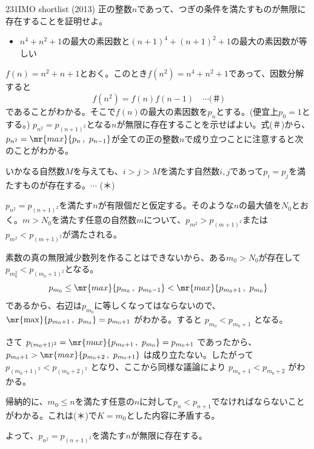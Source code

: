 \begin{prob}{231}{}{IMO shortlist (2013)}
 正の整数$n$であって、つぎの条件を満たすものが無限に存在することを証明せよ。
 \begin{itemize}
  \item[条件:] $n^4+n^2+1$の最大の素因数と$(n+1)^4+(n+1)^2+1$の最大の素因数が等しい 
 \end{itemize}
\end{prob}
$f(n)=n^2+n+1$とおく。このとき$f(n^2)=n^4+n^2+1$であって、因数分解すると
\[ f(n^2)=f(n)f(n-1) \quad\cdots\text{(＃)} \]
であることがわかる。そこで$f(n)$の最大の素因数を$p_n$とする。(便宜上$p_0=1$とする。) $p_{n^2}=p_{(n+1)^2}$となる$n$が無限に存在することを示せばよい。式(＃)から、$p_{n^2}=\mr{max}\{p_n\,,\,\,p_{n-1}\}$が全ての正の整数$n$で成り立つことに注意すると次のことがわかる。

いかなる自然数$M$を与えても、$i>j>M$を満たす自然数$i, j$であって$p_i=p_j$を満たすものが存在する。$\cdots$ (＊)

$p_{n^2}=p_{(n+1)^2}$を満たす$n$が有限個だと仮定する。そのような$n$の最大値を$N_0$とおく。$m>N_0$を満たす任意の自然数$m$について、$p_{m^2}>p_{(m+1)^2}$または$p_{m^2}<p_{(m+1)^2}$が満たされる。

素数の真の無限減少数列を作ることはできないから、ある$m_0>N_0$が存在して$p_{m_0^2}<p_{(m_0+1)^2}$となる。
\[ p_{m_0}\le \mr{max}\{p_{m_0}\,,\,\,p_{m_0-1}\} < \mr{max}\{p_{m_0+1}\,,\,\,p_{m_0}\} \]
であるから、右辺は$p_{m_0}$に等しくなってはならないので、 $\mr{\max}\{p_{m_0+1}\,,\,\,p_{m_0}\}=p_{m_0+1}$ がわかる。すると $p_{m_0}<p_{m_0+1}$ となる。

さて $p_{(m_0+1)^2}=\mr{max}\{p_{m_0+1}\,,\,\,p_{m_0}\}=p_{m_0+1}$ であったから、 $p_{m_0+1}>\mr{max}\{p_{m_0+2}\,,\,\,p_{m_0+1}\}$ は成り立たない。したがって $p_{(m_0+1)^2}<p_{(m_0+2)^2}$ となり、ここから同様な議論により $p_{m_0+1}<p_{m_0+2}$ がわかる。

帰納的に、$m_0\le n$を満たす任意の$n$に対して$p_n<p_{n+1}$でなければならないことがわかる。これは(＊)で$K=m_0$とした内容に矛盾する。

よって、$p_{n^2}=p_{(n+1)^2}$を満たす$n$が無限に存在する。